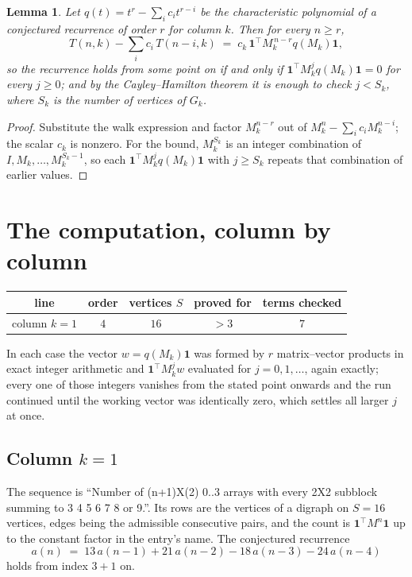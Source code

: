 \documentclass[11pt,a4paper]{article}
\theoremstyle{plain}
\newtheorem{lemma}[theorem]{Lemma}
\theoremstyle{definition}
\begin{document}
\begin{lemma}\label{lem:crit}
Let $q(t)=t^{r}-\sum_i c_it^{r-i}$ be the characteristic polynomial of a conjectured
recurrence of order $r$ for column $k$. Then for every $n\ge r$,
\[
T(n,k)-\sum_i c_i\,T(n-i,k)\;=\;c_k\,\mathbf{1}^{\!\top}M_k^{\,n-r}q(M_k)\mathbf{1},
\]
so the recurrence holds from some point on if and only if
$\mathbf{1}^{\!\top}M_k^{j}q(M_k)\mathbf{1}=0$ for every $j\ge0$; and by the
Cayley--Hamilton theorem it is enough to check $j<S_k$, where $S_k$ is the number of vertices
of $G_k$.
\end{lemma}

\begin{proof}
Substitute the walk expression and factor $M_k^{n-r}$ out of $M_k^{n}-\sum_ic_iM_k^{n-i}$;
the scalar $c_k$ is nonzero. For the bound, $M_k^{S_k}$ is an integer combination of
$I,M_k,\dots,M_k^{S_k-1}$, so each $\mathbf{1}^{\!\top}M_k^{j}q(M_k)\mathbf{1}$ with
$j\ge S_k$ repeats that combination of earlier values.
\end{proof}

\section{The computation, column by column}

\begin{center}
\begin{tabular}{ccccc}
line & order & vertices $S$ & proved for & terms checked \\ \hline
column $k$$=1$ & $4$ & $16$ & $>3$ & $7$ \\
\end{tabular}
\end{center}

In each case the vector $w=q(M_k)\mathbf{1}$ was formed by $r$ matrix--vector products in
exact integer arithmetic and $\mathbf{1}^{\!\top}M_k^{j}w$ evaluated for $j=0,1,\dots$,
again exactly; every one of those integers vanishes from the stated point onwards and the run
continued until the working vector was identically zero, which settles all larger $j$ at once.

\subsection*{Column $k$$=1$}
The sequence is ``Number of (n+1)X(2) 0..3 arrays with every 2X2 subblock summing to 3 4 5 6 7 8 or 9.''. Its rows are the vertices of a digraph on
$S=16$ vertices, edges being the admissible consecutive pairs, and the count is
$\mathbf{1}^{\!\top}M^{n}\mathbf{1}$ up to the constant factor in the entry's name.
The conjectured recurrence
\[
a(n)\;=\;13\,a(n-1) + 21\,a(n-2) - 18\,a(n-3) - 24\,a(n-4)
\]
holds from index $3+1$ on.
\end{document}
